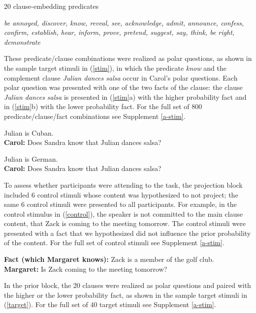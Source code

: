 \documentclass[11pt,fleqn]{article}
\newcommand{\6}{\mbox{$[\hspace*{-.6mm}[$}}
\newcommand{\9}{\mbox{$]\hspace*{-.6mm}]$}}
\begin{document}
\begin{exe}
\ex\label{pred} 20 clause-embedding predicates 

{\em be annoyed, discover, know, reveal, see, acknowledge, admit, announce, confess, confirm, establish, hear, inform, prove, pretend, suggest, say, think, be right, demonstrate}
\end{exe}



These predicate/clause combinations were realized as polar questions, as shown in the sample target stimuli in (\ref{stim}), in which the predicate {\em know} and the complement clause {\em Julian dances salsa} occur in Carol's polar questions. Each polar question was presented with one of the two facts of the clause: the clause {\em Julian dances salsa} is presented in (\ref{stim}a) with the higher probability fact and in (\ref{stim}b) with the lower probability fact. For the full set of 800 predicate/clause/fact combinations see Supplement \ref{a-stim}.

 
\begin{exe}
\ex\label{stim}
\begin{xlist}
 Julian is Cuban.  \\ 
{\bf Carol:} Does Sandra know that Julian dances salsa?

 Julian is German.  \\ 
{\bf Carol:} Does Sandra know that Julian dances salsa?
\end{xlist}
\end{exe}
To assess whether participants were attending to the task, the projection block included 6 control stimuli whose content was hypothesized to not project; the same 6 control stimuli were presented to all participants. For example, in the control stimulus in (\ref{control}), the speaker is not committed to the main clause content, that Zack is coming to the meeting tomorrow. The control stimuli were presented with a fact that we hypothesized did not influence the prior probability of the content. For the full set of control stimuli see Supplement \ref{a-stim}.

\begin{exe}
\ex\label{control} {\bf Fact (which Margaret knows):}  Zack is a member of the golf club. \\ {\bf Margaret:} Is Zack coming to the meeting tomorrow?
\end{exe}

In the prior block, the 20 clauses were realized as polar questions and paired with the higher or the lower probability fact, as shown in the sample target stimuli in (\ref{target}). For the full set of 40 target stimuli see Supplement \ref{a-stim}. 
\end{document}
